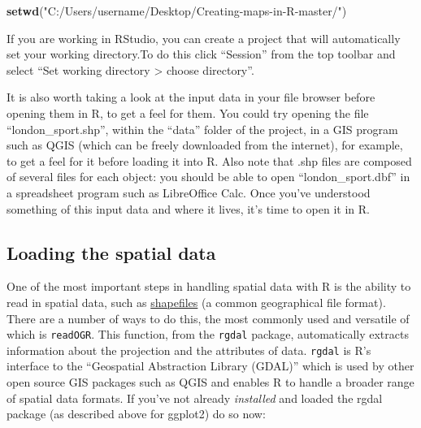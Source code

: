 \documentclass[]{article}
\newenvironment{Shaded}{}{}
\newcommand{\KeywordTok}[1]{\textcolor[rgb]{0.00,0.44,0.13}{\textbf{{#1}}}}
\newcommand{\StringTok}[1]{\textcolor[rgb]{0.25,0.44,0.63}{{#1}}}
\newcommand{\NormalTok}[1]{{#1}}
\begin{document}
\begin{Shaded}
\begin{Highlighting}[]
\KeywordTok{setwd}\NormalTok{(}\StringTok{"C:/Users/username/Desktop/Creating-maps-in-R-master/"}\NormalTok{)}
\end{Highlighting}
\end{Shaded}
If you are working in RStudio, you can create a project that will
automatically set your working directory.To do this click ``Session''
from the top toolbar and select ``Set working directory \textgreater{}
choose directory''.

It is also worth taking a look at the input data in your file browser
before opening them in R, to get a feel for them. You could try opening
the file ``london\_sport.shp'', within the ``data'' folder of the
project, in a GIS program such as QGIS (which can be freely downloaded
from the internet), for example, to get a feel for it before loading it
into R. Also note that .shp files are composed of several files for each
object: you should be able to open ``london\_sport.dbf'' in a
spreadsheet program such as LibreOffice Calc. Once you've understood
something of this input data and where it lives, it's time to open it in
R.

\subsection{Loading the spatial data}

One of the most important steps in handling spatial data with R is the
ability to read in spatial data, such as
\href{http://en.wikipedia.org/wiki/Shapefile}{shapefiles} (a common
geographical file format). There are a number of ways to do this, the
most commonly used and versatile of which is \texttt{readOGR}. This
function, from the \texttt{rgdal} package, automatically extracts
information about the projection and the attributes of data.
\texttt{rgdal} is R's interface to the ``Geospatial Abstraction Library
(GDAL)'' which is used by other open source GIS packages such as QGIS
and enables R to handle a broader range of spatial data formats. If
you've not already \emph{installed} and loaded the rgdal package (as
described above for ggplot2) do so now:
\end{document}
